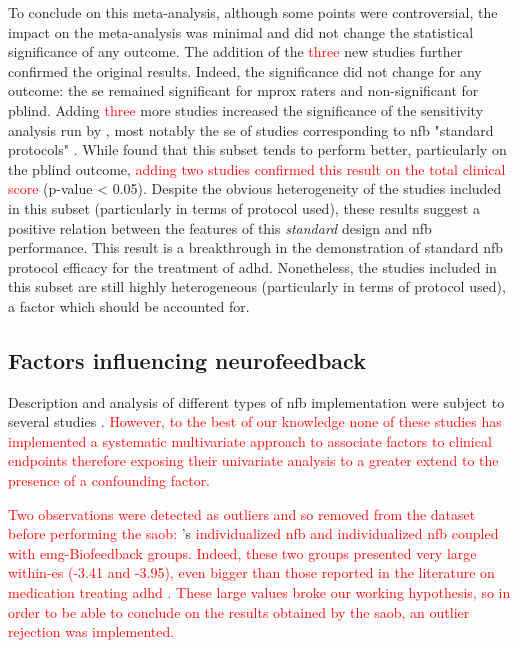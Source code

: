 To conclude on this meta-analysis, although some points were controversial, the impact on the
meta-analysis was minimal and did not change the statistical significance of any outcome. 
The addition of the \textcolor{red}{three} new studies \citep{Strehl2017, Baumeister2016, Bazanova2018} further confirmed the original results. Indeed, the
significance did not change for any outcome: the \gls{se} remained significant for \gls{mprox} raters and
non-significant for \gls{pblind}. Adding \textcolor{red}{three} more studies increased the significance of the sensitivity analysis run by
\citeauthor{Cortese2016}, most notably the \gls{se} of studies corresponding to \gls{nfb} "standard protocols" \citep{Arns2014}. 
While \citeauthor{Cortese2016} found that this subset tends to perform better, particularly on the \gls{pblind} outcome, 
\textcolor{red}{adding two studies confirmed this result on the total clinical score} (p-value < 0.05). Despite the obvious heterogeneity 
of the studies included in this subset (particularly in terms of protocol used), these results suggest a positive relation 
between the features of this \emph{standard} design and \gls{nfb} performance. This result is a breakthrough in the demonstration 
of standard \gls{nfb} protocol efficacy for the treatment of \gls{adhd}. Nonetheless, the  studies 
included in this subset are still highly heterogeneous (particularly in terms of protocol used), a factor which should be accounted for.


\subsection{Factors influencing neurofeedback}

Description and analysis of different types of \gls{nfb} implementation were subject to several studies \citep{Arns2014, 
Enriquez2017, Vernon2004, Jeunet2018, Arns2009, Cortese2016}. \textcolor{red}{However, to the best of our knowledge none of these studies has 
implemented a systematic multivariate approach to associate factors to clinical endpoints therefore exposing their univariate analysis to a 
greater extend to the presence of a confounding factor.}

\textcolor{red}{Two observations were detected as outliers and so removed from the dataset before performing the \gls{saob}: }\citeauthor{Bazanova2018}'s \textcolor{red}{individualized \gls{nfb} and 
individualized \gls{nfb} coupled with \gls{emg}-Biofeedback groups. Indeed, these two groups presented very large within-\gls{es} (-3.41 and -3.95), even bigger than those reported in the literature on medication treating 
\gls{adhd}} \citep{Luan2017}\textcolor{red}{. These large values broke our working hypothesis, so in order to be able to conclude on the results obtained by the \gls{saob}, an outlier 
rejection was implemented.}

